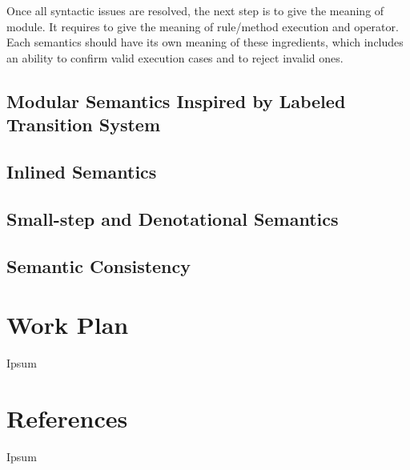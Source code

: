 Once all syntactic issues are resolved, the next step is to give the
meaning of module. It requires to give the meaning of rule/method
execution and \ModP{} operator. Each semantics should have its own
meaning of these ingredients, which includes an ability to confirm
valid execution cases and to reject invalid ones.

\subsection{Modular Semantics Inspired by Labeled Transition System}

\subsection{Inlined Semantics}

\subsection{Small-step and Denotational Semantics}

\subsection{Semantic Consistency}

\section{Work Plan}

Ipsum

\section{References}

Ipsum
